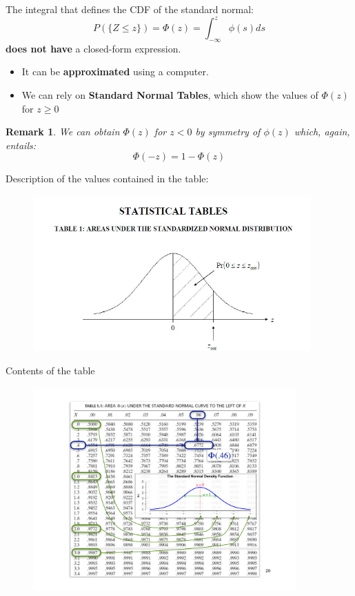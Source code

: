 \documentclass[smaller]{beamer}\usepackage[]{graphicx}\usepackage[]{color}
\newtheorem{remark}{Remark}[section]
\renewcommand{\Pr}{P}
\begin{document}
\begin{frame}{\subsecname}
The integral that defines the CDF of the standard normal:
  $$
  \Pr(\{Z\leq z\})=\Phi(z)=\int_{-\infty}^z\phi(s)ds
  $$
  \textbf{does not have} a closed-form expression.

  \begin{itemize}
    \item It can be \textbf{approximated} using a computer.
    \item We can rely on \textbf{Standard Normal Tables}, which show the values of $\Phi(z)$ for $z\geq 0$
  \end{itemize}
  
  \begin{remark}
     We can obtain $\Phi(z)$ for $z < 0$ by symmetry of $\phi(z)$ which, again, entails:
     $$\Phi(-z)=1-\Phi(z)$$
  \end{remark}
\end{frame}

\begin{frame}{\subsecname}
Description of the values contained in the table:
  \begin{figure}[ptb]\centering
  \includegraphics[width=0.95\textwidth,height=0.75\textheight]{img/bell_curve__5.pdf}
  \end{figure}
\end{frame}


\begin{frame}{\subsecname}
Contents of the table
  \begin{figure}[ptb]\centering
  \includegraphics[width=0.9\textwidth,height=0.95\textheight]{img/myTableGauss.pdf}
  \end{figure}
\end{frame}
  
\end{document}
